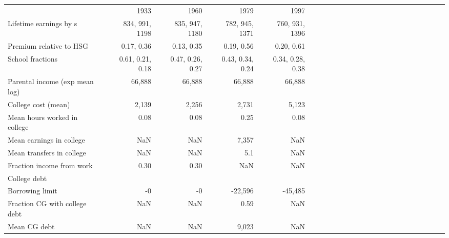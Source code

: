 \begin{tabular}{lrrrrrrrrrrrrrrrrrrrrrrr}
\hline
 & 1933  & 1960  & 1979  & 1997  &   &   &   &   &   &   &   &   &   &   &   &   &   &   &   &   &   &   &   \\ 
Lifetime earnings by s & 834, 991, 1198  & 835, 947, 1180  & 782, 945, 1371  & 760, 931, 1396  &   &   &   &   &   &   &   &   &   &   &   &   &   &   &   &   &   &   &   \\ 
Premium relative to HSG & 0.17, 0.36  & 0.13, 0.35  & 0.19, 0.56  & 0.20, 0.61  &   &   &   &   &   &   &   &   &   &   &   &   &   &   &   &   &   &   &   \\ 
School fractions & 0.61, 0.21, 0.18  & 0.47, 0.26, 0.27  & 0.43, 0.34, 0.24  & 0.34, 0.28, 0.38  &   &   &   &   &   &   &   &   &   &   &   &   &   &   &   &   &   &   &   \\ 
Parental income (exp mean log) & 66,888  & 66,888  & 66,888  & 66,888  &   &   &   &   &   &   &   &   &   &   &   &   &   &   &   &   &   &   &   \\ 
College cost (mean) & 2,139  & 2,256  & 2,731  & 5,123  &   &   &   &   &   &   &   &   &   &   &   &   &   &   &   &   &   &   &   \\ 
Mean hours worked in college & 0.08  & 0.08  & 0.25  & 0.08  &   &   &   &   &   &   &   &   &   &   &   &   &   &   &   &   &   &   &   \\ 
Mean earnings in college & NaN  & NaN  & 7,357  & NaN  &   &   &   &   &   &   &   &   &   &   &   &   &   &   &   &   &   &   &   \\ 
Mean transfers in college & NaN  & NaN  & 5.1  & NaN  &   &   &   &   &   &   &   &   &   &   &   &   &   &   &   &   &   &   &   \\ 
Fraction income from work & 0.30  & 0.30  & NaN  & NaN  &   &   &   &   &   &   &   &   &   &   &   &   &   &   &   &   &   &   &   \\ 
College debt &   &   &   &   &   &   &   &   &   &   &   &   &   &   &   &   &   &   &   &   &   &   &   \\ 
Borrowing limit & -0  & -0  & -22,596  & -45,485  &   &   &   &   &   &   &   &   &   &   &   &   &   &   &   &   &   &   &   \\ 
Fraction CG with college debt & NaN  & NaN  & 0.59  & NaN  &   &   &   &   &   &   &   &   &   &   &   &   &   &   &   &   &   &   &   \\ 
Mean CG debt & NaN  & NaN  & 9,023  & NaN  &   &   &   &   &   &   &   &   &   &   &   &   &   &   &   &   &   &   &   \\ 
\hline
\end{tabular}%
